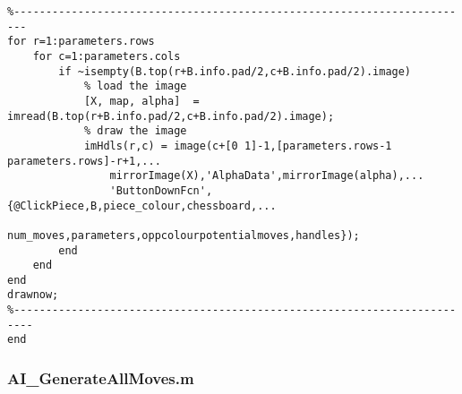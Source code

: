 \documentclass{article}
\begin{document}
\begin{lstlisting}
%------------------------------------------------------------------------
for r=1:parameters.rows
    for c=1:parameters.cols
        if ~isempty(B.top(r+B.info.pad/2,c+B.info.pad/2).image)
            % load the image
            [X, map, alpha]  = imread(B.top(r+B.info.pad/2,c+B.info.pad/2).image);
            % draw the image
            imHdls(r,c) = image(c+[0 1]-1,[parameters.rows-1 parameters.rows]-r+1,...
                mirrorImage(X),'AlphaData',mirrorImage(alpha),...
                'ButtonDownFcn',{@ClickPiece,B,piece_colour,chessboard,...
                num_moves,parameters,oppcolourpotentialmoves,handles});
        end
    end
end
drawnow;
%-------------------------------------------------------------------------
end
\end{lstlisting}

\subsubsection{AI\_GenerateAllMoves.m}
\end{document}
